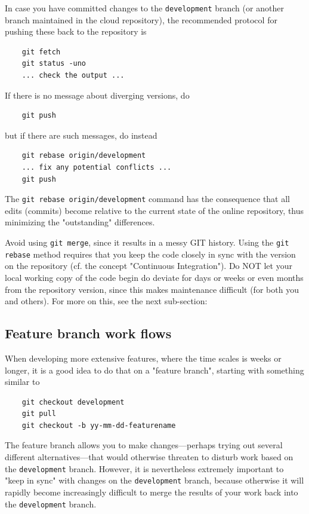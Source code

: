 \documentclass[paper=a4,fontsize=11pt]{scrartcl}
\numberwithin{equation}{section}		%
\numberwithin{figure}{section}			%
\numberwithin{table}{section}				%
\newcommand{\gitcolor}{\color{Brown}}
\newcommand{\Git}[1]{\texttt{\gitcolor #1}}
\newcommand{\git}[1]{\texttt{\gitcolor git #1}}
\begin{document}
In case you have committed changes to the \Git{development} branch (or another branch maintained in the cloud repository), the recommended protocol for pushing these back to the repository is
{\gitcolor\begin{verbatim}
    git fetch
    git status -uno
    ... check the output ...
\end{verbatim}}
If there is no message about diverging versions, do
{\gitcolor\begin{verbatim}
    git push
\end{verbatim}}
but if there are such messages, do instead
{\gitcolor\begin{verbatim}
    git rebase origin/development
    ... fix any potential conflicts ...
    git push
\end{verbatim}}
The \git{rebase origin/development} command has the consequence that all edits (commits) become relative to the current state of the online repository, thus minimizing the "outstanding" differences.

Avoid using \git{merge}, since it results in a messy GIT history.   Using the \git{rebase} method requires that you keep the code closely in sync with the version on the repository (cf. the concept "Continuous Integration").  Do NOT let your local working copy of the code begin do deviate for days or weeks or even months from the repository version, since this makes maintenance difficult (for both you and others).  For more on this, see the next sub-section:

\subsection{Feature branch work flows}
When developing more extensive features, where the time scales is weeks or longer, it is a good idea to do that on a "feature branch", starting with something similar to
{\gitcolor\begin{verbatim}
    git checkout development
    git pull
    git checkout -b yy-mm-dd-featurename
\end{verbatim}}
The feature branch allows you to make changes---perhaps trying out several different alternatives---that would otherwise threaten to disturb work based on the \Git{development} branch.  However, it is nevertheless extremely important to "keep in sync" with changes on the \Git{development} branch, because otherwise it will rapidly become increasingly difficult to merge the results of your work back into the \Git{development} branch.
\end{document}
